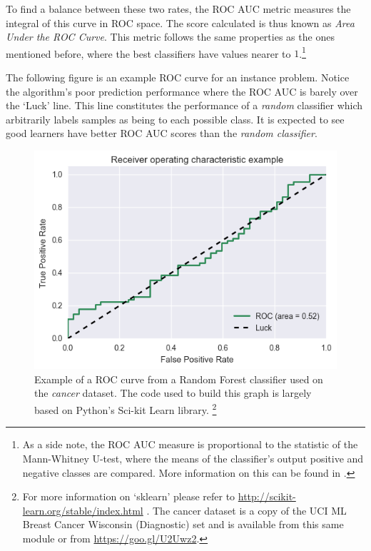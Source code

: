 To find a balance between these two rates, the ROC AUC metric measures the integral of this curve in ROC space.
The score calculated is thus known as \textit{Area Under the ROC Curve}.
This metric follows the same properties as the ones mentioned before, where the best classifiers have values nearer to $1$.\footnote{As a side note, the ROC AUC measure is proportional to the statistic of the Mann-Whitney U-test, where the means of the classifier's output positive and negative classes are compared.
More information on this can be found in \textcite{mason-rocAucRelationship}.}



The following figure is an example ROC curve for an instance problem.
Notice the algorithm's poor prediction performance where the ROC AUC is barely over the `Luck' line.
This line constitutes the performance of a \textit{random} classifier which arbitrarily labels samples as being to each possible class.
It is expected to see good learners have better ROC AUC scores than the \textit{random classifier}.

\begin{figure}[h!]
\begin{center}
\includegraphics[width=0.7\columnwidth]{figures/figure-lowROCAUC/figure-lowROCAUC_original}
\caption{Example of a ROC curve from a Random Forest classifier used on the \textit{cancer} dataset.
The code used to build this graph is largely based on Python's Sci-kit Learn library.
\protect\footnote{For more information on `sklearn' please refer to \url{http://scikit-learn.org/stable/index.html} \protect\textcite{scikit-learn}.
The cancer dataset is a copy of the UCI ML Breast Cancer Wisconsin (Diagnostic) set and is available from this same module or from \url{https://goo.gl/U2Uwz2}.}}
\end{center}
\end{figure}\label{fg:lowROCAUC}
%

